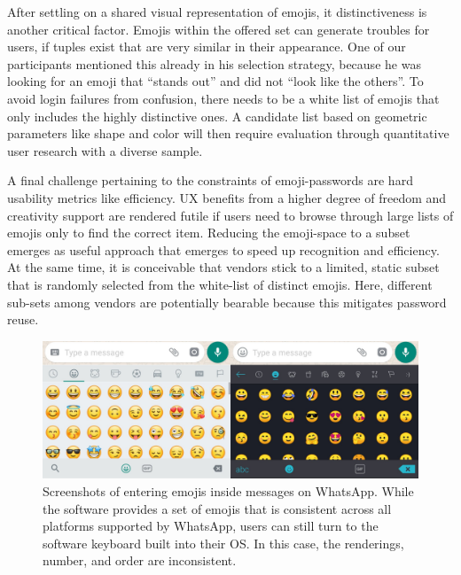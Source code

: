 After settling on a shared visual representation of emojis, it distinctiveness is another critical factor. Emojis within the offered set can generate troubles for users, if tuples exist that are very similar in their appearance. One of our participants mentioned this already in his selection strategy, because he was looking for an emoji that ``stands out'' and did not ``look like the others''. To avoid login failures from confusion, there needs to be a white list of emojis that only includes the highly distinctive ones. A candidate list based on geometric parameters like shape and color will then require evaluation through quantitative user research with a diverse sample.

A final challenge pertaining to the constraints of emoji-passwords are hard usability metrics like efficiency. UX benefits from a higher degree of freedom and creativity support are rendered futile if users need to browse through large lists of emojis only to find the correct item. Reducing the emoji-space to a subset emerges as useful approach that emerges to speed up recognition and efficiency. At the same time, it is conceivable that vendors stick to a limited, static subset that is randomly selected from the white-list of distinct emojis. Here, different sub-sets among vendors are potentially bearable because this mitigates password reuse. 

\begin{figure}
	\centering
	\includegraphics[width=0.7\linewidth]{figures/emojipasswords/app-vs-platform-emojis}
	\caption{\label{fig:emojipasswords.app-vs-platform-emojis}
		Screenshots of entering emojis inside messages on WhatsApp. While the software provides a set of emojis that is consistent across all platforms supported by WhatsApp, users can still turn to the software keyboard built into their OS. In this case, the renderings, number, and order are inconsistent.
	}
\end{figure}




